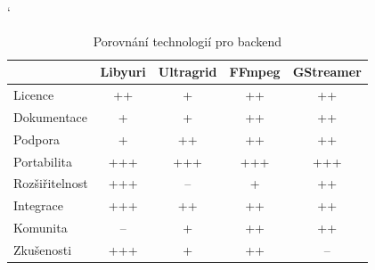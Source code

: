 \documentclass[thesis=M,czech]{FITthesis}[2012/06/26]
\begin{document}
\begin{table}
\catcode` %
\centering
\begin{tabular}{l|l|l|l|l|}
\cline{2-5}
\multicolumn{1}{c|}{}                & \multicolumn{1}{c|}{Libyuri} & \multicolumn{1}{c|}{Ultragrid} & \multicolumn{1}{c|}{FFmpeg} & \multicolumn{1}{c|}{GStreamer} \\ \hline
\multicolumn{1}{|l|}{Licence}        & \multicolumn{1}{c|}{++}      & \multicolumn{1}{c|}{+}         & \multicolumn{1}{c|}{++}                                     & \multicolumn{1}{c|}{++}        \\ \hline
\multicolumn{1}{|l|}{Dokumentace}    & \multicolumn{1}{c|}{+}       & \multicolumn{1}{c|}{+}         & \multicolumn{1}{c|}{++}                                      & \multicolumn{1}{c|}{++}        \\ \hline
\multicolumn{1}{|l|}{Podpora}        & \multicolumn{1}{c|}{+}       & \multicolumn{1}{c|}{++}        & \multicolumn{1}{c|}{++}                                      & \multicolumn{1}{c|}{++}        \\ \hline
\multicolumn{1}{|l|}{Portabilita}    & \multicolumn{1}{c|}{+++}     & \multicolumn{1}{c|}{+++}       & \multicolumn{1}{c|}{+++}                                    & \multicolumn{1}{c|}{+++}       \\ \hline
\multicolumn{1}{|l|}{Rozšiřitelnost} & \multicolumn{1}{c|}{+++}     & \multicolumn{1}{c|}{--}         & \multicolumn{1}{c|}{+}                                      & \multicolumn{1}{c|}{++}        \\ \hline
\multicolumn{1}{|l|}{Integrace}      & \multicolumn{1}{c|}{+++}     & \multicolumn{1}{c|}{++}        & \multicolumn{1}{c|}{++}                                     & \multicolumn{1}{c|}{++}        \\ \hline
\multicolumn{1}{|l|}{Komunita}       & \multicolumn{1}{c|}{--}       & \multicolumn{1}{c|}{+}         & \multicolumn{1}{c|}{++}                                     & \multicolumn{1}{c|}{++}        \\ \hline
\multicolumn{1}{|l|}{Zkušenosti}     & \multicolumn{1}{c|}{+++}     & \multicolumn{1}{c|}{+}         & \multicolumn{1}{c|}{++}                                     & \multicolumn{1}{c|}{--}         \\ \hline
\end{tabular}
\caption{Porovnání technologií pro backend}

\label{tbl:table_backend}
\end{table}
\end{document}
